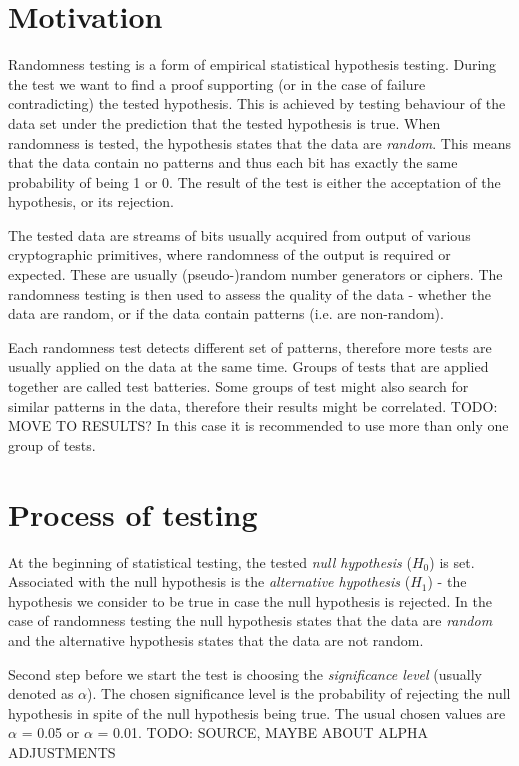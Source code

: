 \documentclass[
  digital,     %
  oneside,     %
  nosansbold,  %
  nocolorbold, %
  nolof,         %
  nolot,         %
]{fithesis4}
\begin{document}
\section{Motivation}

Randomness testing is a form of empirical statistical hypothesis testing. During the test we want to find a proof supporting (or in the case of failure contradicting) the tested hypothesis. This is achieved by testing behaviour of the data set under the prediction that the tested hypothesis is true. When randomness is tested, the hypothesis states that the data are \emph{random}. This means that the data contain no patterns and thus each bit has exactly the same probability of being 1 or 0. The result of the test is either the acceptation of the hypothesis, or its rejection.

The tested data are streams of bits usually acquired from output of various cryptographic primitives, where randomness of the output is required or expected. These are usually (pseudo-)random number generators or ciphers. The randomness testing is then used to assess the quality of the data - whether the data are random, or if the data contain patterns (i.e. are non-random).

Each randomness test detects different set of patterns, therefore more tests are usually applied on the data at the same time. Groups of tests that are applied together are called test batteries. Some groups of test might also search for similar patterns in the data, therefore their results might be correlated. \cite[p. 2]{bad_day} TODO: MOVE TO RESULTS? In this case it is recommended to use more than only one group of tests.

\section{Process of testing} \label{chap:rand-process}

At the beginning of statistical testing, the tested \emph{null hypothesis}  ($H_0$) is set. Associated with the null hypothesis is the \emph{alternative hypothesis} ($H_1$) - the hypothesis we consider to be true in case the null hypothesis is rejected. In the case of randomness testing the null hypothesis states that the data are \emph{random} and the alternative hypothesis states that the data are not random.

Second step before we start the test is choosing the \emph{significance level} (usually denoted as $\alpha$). The chosen significance level is the probability of rejecting the null hypothesis in spite of the null hypothesis being true. The usual chosen values are $\alpha$ = 0.05 or $\alpha$ = 0.01. TODO: SOURCE, MAYBE ABOUT ALPHA ADJUSTMENTS
\end{document}
